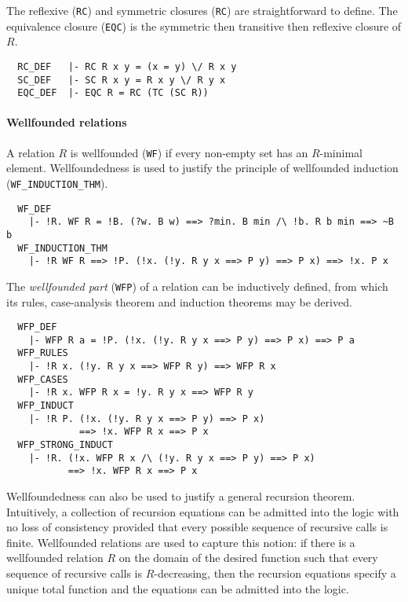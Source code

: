 \medskip

The reflexive ({\small\verb+RC+}) and symmetric closures
({\small\verb+RC+}) are straightforward to define. The equivalence
closure ({\small\verb+EQC+}) is the symmetric then transitive then
reflexive closure of $R$.
%
\begin{hol}
{\small
\begin{verbatim}
  RC_DEF   |- RC R x y = (x = y) \/ R x y
  SC_DEF   |- SC R x y = R x y \/ R y x
  EQC_DEF  |- EQC R = RC (TC (SC R))
\end{verbatim}
}
\end{hol}

\paragraph {Wellfounded relations}

A relation $R$ is wellfounded ({\small\verb+WF+}) if every non-empty set
has an $R$-minimal element. Wellfoundedness is used to justify the
principle of wellfounded induction ({\small\verb+WF_INDUCTION_THM+}).
%
\begin{hol}
{\small
\begin{verbatim}
  WF_DEF
    |- !R. WF R = !B. (?w. B w) ==> ?min. B min /\ !b. R b min ==> ~B b
  WF_INDUCTION_THM
    |- !R WF R ==> !P. (!x. (!y. R y x ==> P y) ==> P x) ==> !x. P x
\end{verbatim}
}
\end{hol}

The \emph{wellfounded part} ({\small\verb+WFP+}) of a relation can be
inductively defined, from which its rules, case-analysis theorem and
induction theorems may be derived.
%
\begin{hol}
{\small
\begin{verbatim}
  WFP_DEF
    |- WFP R a = !P. (!x. (!y. R y x ==> P y) ==> P x) ==> P a
  WFP_RULES
    |- !R x. (!y. R y x ==> WFP R y) ==> WFP R x
  WFP_CASES
    |- !R x. WFP R x = !y. R y x ==> WFP R y
  WFP_INDUCT
    |- !R P. (!x. (!y. R y x ==> P y) ==> P x)
             ==> !x. WFP R x ==> P x
  WFP_STRONG_INDUCT
    |- !R. (!x. WFP R x /\ (!y. R y x ==> P y) ==> P x)
           ==> !x. WFP R x ==> P x
\end{verbatim}
}
\end{hol}

Wellfoundedness can also be used to justify a general recursion
theorem. Intuitively, a collection of recursion equations can be
admitted into the \HOL{} logic with no loss of consistency provided
that every possible sequence of recursive calls is finite. Wellfounded
relations are used to capture this notion: if there is a wellfounded
relation $R$ on the domain of the desired function such that every
sequence of recursive calls is $R$-decreasing, then the recursion
equations specify a unique total function and the equations can be
admitted into the logic.

